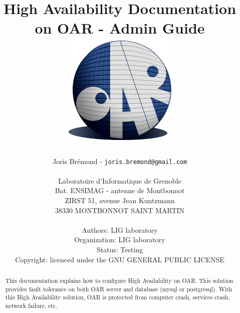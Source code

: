 \documentclass[a4paper,10pt]{report}
\title{High Availability Documentation on OAR - Admin Guide\\
\includegraphics[scale=0.7]{schema/oar_logo_detoure.png}}
\author{Joris Brémond - \texttt{joris.bremond@gmail.com}\\
\\
Laboratoire d'Informatique de Grenoble\\
Bat. ENSIMAG - antenne de Montbonnot\\
ZIRST 51, avenue Jean Kuntzmann\\
38330 MONTBONNOT SAINT MARTIN\\
\\
Authors: LIG laboratory\\
Organization: LIG laboratory\\
Status: Testing\\
Copyright: licenced under the GNU GENERAL PUBLIC LICENSE\\
}
\begin{document}
\maketitle
\tableofcontents

\begin{abstract}
This documentation explains how to configure High Availability on OAR. This solution provides fault tolerance on both OAR server and database (mysql or postgresql).
With this High Availability solution, OAR is protected from computer crash, services crash, network failure, etc.
\end{abstract}












  
\end{document}
